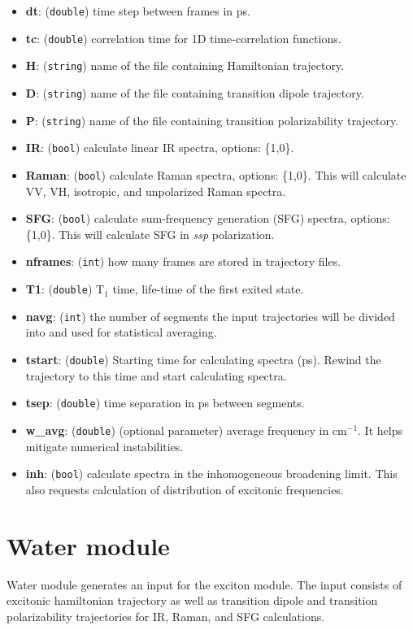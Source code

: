 \documentclass{article}
\begin{document}
\begin{itemize}
\item \textbf{dt}: (\texttt{double}) time step between frames in ps.
\item \textbf{tc}: (\texttt{double}) correlation time for 1D time-correlation functions.
\item \textbf{H}: (\texttt{string}) name of the file containing Hamiltonian trajectory. 
\item \textbf{D}: (\texttt{string}) name of the file containing transition dipole trajectory. 
\item \textbf{P}: (\texttt{string}) name of the file containing transition polarizability trajectory. 
\item \textbf{IR}: (\texttt{bool}) calculate linear IR spectra, options: \{1,0\}.
\item \textbf{Raman}: (\texttt{bool}) calculate Raman spectra, options: \{1,0\}. This will calculate VV, VH, isotropic, and unpolarized Raman spectra.
\item \textbf{SFG}: (\texttt{bool}) calculate sum-frequency generation (SFG) spectra, options: \{1,0\}. This will calculate SFG in \textit{ssp} polarization.
\item \textbf{nframes}: (\texttt{int}) how many frames are stored in trajectory files.
\item \textbf{T1}: (\texttt{double}) T$_1$ time, life-time of the first exited state.
\item \textbf{navg}: (\texttt{int}) the number of segments the input trajectories will be divided into and used for statistical averaging.
\item \textbf{tstart}: (\texttt{double}) Starting time for calculating spectra (ps). Rewind the trajectory to this time and start calculating spectra. 
\item \textbf{tsep}: (\texttt{double}) time separation in ps between segments.
\item \textbf{w\_avg}: (\texttt{double}) (optional parameter) average frequency  in cm$^{-1}$. It helps mitigate numerical instabilities.
\item \textbf{inh}: (\texttt{bool}) calculate spectra in the inhomogeneous broadening limit. This also requests
calculation of distribution of excitonic frequencies.

\end{itemize}

%
%
\section{Water module}
Water module generates an input for the exciton module. The input consists of excitonic hamiltonian trajectory as well as 
transition dipole and transition polarizability trajectories for IR, Raman, and SFG calculations.
\end{document}
